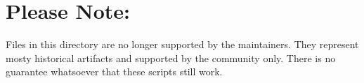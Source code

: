 \chapter{Please Note\+:}
\hypertarget{md_build_2__deps_2googletest-src_2googletest_2scripts_2_r_e_a_d_m_e}{}\label{md_build_2__deps_2googletest-src_2googletest_2scripts_2_r_e_a_d_m_e}
\label{md_build_2__deps_2googletest-src_2googletest_2scripts_2_r_e_a_d_m_e_autotoc_md406}%
%
 Files in this directory are no longer supported by the maintainers. They represent mosty historical artifacts and supported by the community only. There is no guarantee whatsoever that these scripts still work. 